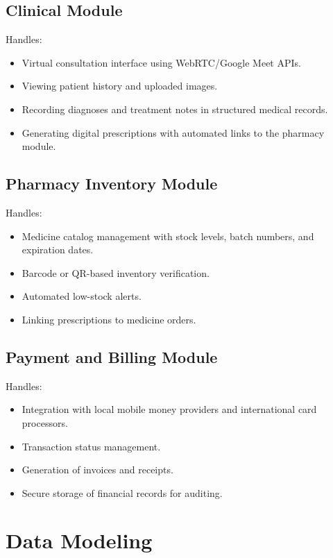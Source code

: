 \documentclass[12pt,a4paper]{report}
\begin{document}
\subsection{Clinical Module}
Handles:
\begin{itemize}
    \item Virtual consultation interface using WebRTC/Google Meet APIs.
    \item Viewing patient history and uploaded images.
    \item Recording diagnoses and treatment notes in structured medical records.
    \item Generating digital prescriptions with automated links to the pharmacy module.
\end{itemize}

\subsection{Pharmacy Inventory Module}
Handles:
\begin{itemize}
    \item Medicine catalog management with stock levels, batch numbers, and expiration dates.
    \item Barcode or QR-based inventory verification.
    \item Automated low-stock alerts.
    \item Linking prescriptions to medicine orders.
\end{itemize}

\subsection{Payment and Billing Module}
Handles:
\begin{itemize}
    \item Integration with local mobile money providers and international card processors.
    \item Transaction status management.
    \item Generation of invoices and receipts.
    \item Secure storage of financial records for auditing.
\end{itemize}

\section{Data Modeling}
\end{document}

